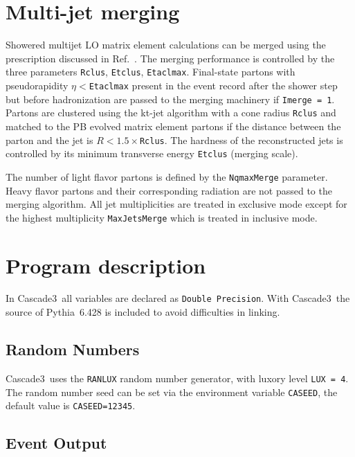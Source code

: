 \documentclass[11pt]{article} \usepackage{mystyle-new}
\def\cascade{{\sc Cascade3}}
\def\PYTHIA{{\sc Pythia}}
\newenvironment{tolerant}[1]{\par\tolerance=#1\relax}{ \par }
\begin{document}
\section{Multi-jet merging}
\label{mulitjetMerging}

Showered multijet LO matrix element calculations can be merged using the prescription discussed in Ref.~\cite{PB-MLM}. The merging performance is controlled by the three parameters \verb+Rclus+, \verb+Etclus+, \verb+Etaclmax+. Final-state partons  with pseudorapidity $\eta<$\verb+Etaclmax+ present in the event record after the shower step but before hadronization are passed to the merging machinery if \verb+Imerge = 1+. Partons are clustered using the kt-jet algorithm with a cone radius \verb+Rclus+ and matched to the PB evolved matrix element partons if the distance between the parton and the jet is $R< 1.5\times$\verb+Rclus+. The hardness of the reconstructed jets is controlled by its minimum transverse energy \verb+Etclus+ (merging scale).

\begin{tolerant}{3000}
The number of light flavor partons is defined by the \verb+NqmaxMerge+ parameter. Heavy flavor partons and their corresponding radiation are not passed to the merging algorithm. All jet multiplicities are treated in exclusive mode except for the highest multiplicity \verb+MaxJetsMerge+ which is treated in inclusive mode. 
\end{tolerant}



\section{Program description}
In \cascade\ all variables are declared as \verb"Double Precision".  With \cascade\ the source of  \PYTHIA\ 6.428 is included to avoid difficulties in linking.

\subsection{Random Numbers}
\cascade\ uses the \verb+RANLUX+ random number generator, with luxory level      \verb+LUX = 4+. The random number seed can be set via the environment variable \verb+CASEED+, the default value is \verb+CASEED=12345+.

\subsection{Event Output}
\end{document}
